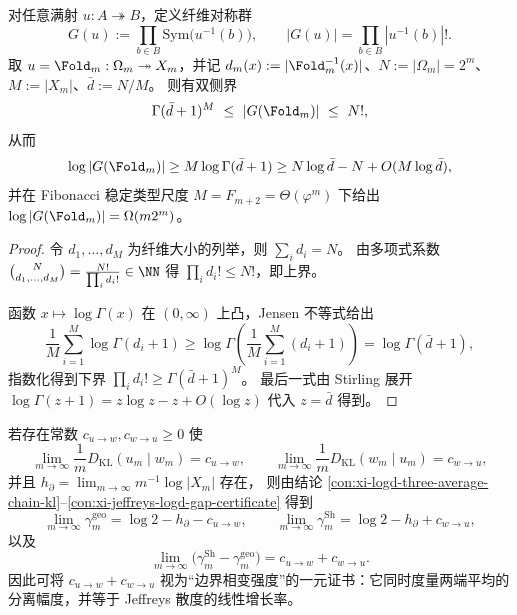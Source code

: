 \begin{proposition}\label{prop:xi-fold-fiber-symmetry-group-entropy-lower}
对任意满射 \(u:A\twoheadrightarrow B\)，定义纤维对称群
\[
G(u):=\prod_{b\in B}\mathrm{Sym}\bigl(u^{-1}(b)\bigr),
\qquad
|G(u)|=\prod_{b\in B}|u^{-1}(b)|!.
\]
取 \(u=\Fold_m:\Omega_m\twoheadrightarrow X_m\)，并记 \(d_m(x):=|\Fold_m^{-1}(x)|\)、\(N:=|\Omega_m|=2^m\)、\(M:=|X_m|\)、\(\bar d:=N/M\)。
则有双侧界
\[
\Gamma(\bar d+1)^{M}\ \le\ |G(\Fold_m)|\ \le\ N!,
\]
从而
\[
\log|G(\Fold_m)|
\ge
M\log\Gamma(\bar d+1)
\ge
N\log\bar d-N+O(M\log\bar d),
\]
并在 Fibonacci 稳定类型尺度 \(M=F_{m+2}=\Theta(\varphi^m)\) 下给出
\(
\log|G(\Fold_m)|=\Omega(m2^m)
\)。
\end{proposition}
\begin{proof}
令 \(d_1,\dots,d_M\) 为纤维大小的列举，则 \(\sum_i d_i=N\)。
由多项式系数
\(
\binom{N}{d_1,\dots,d_M}=\frac{N!}{\prod_i d_i!}\in\NN
\)
得 \(\prod_i d_i!\le N!\)，即上界。
\par
函数 \(x\mapsto \log\Gamma(x)\) 在 \((0,\infty)\) 上凸，Jensen 不等式给出
\[
\frac1M\sum_{i=1}^M\log\Gamma(d_i+1)\ge \log\Gamma\!\left(\frac1M\sum_{i=1}^M(d_i+1)\right)=\log\Gamma(\bar d+1),
\]
指数化得到下界 \(\prod_i d_i!\ge \Gamma(\bar d+1)^M\)。
最后一式由 Stirling 展开 \(\log\Gamma(z+1)=z\log z-z+O(\log z)\) 代入 \(z=\bar d\) 得到。
\end{proof}


\begin{conclusion}\label{con:xi-boundary-phase-transition-kl-rates}
若存在常数 \(c_{u\to w},c_{w\to u}\ge 0\) 使
\[
\lim_{m\to\infty}\frac{1}{m}D_{\mathrm{KL}}(u_m\mid w_m)=c_{u\to w},
\qquad
\lim_{m\to\infty}\frac{1}{m}D_{\mathrm{KL}}(w_m\mid u_m)=c_{w\to u},
\]
并且 \(h_\partial=\lim_{m\to\infty}m^{-1}\log|X_m|\) 存在，
则由结论 \ref{con:xi-logd-three-average-chain-kl}--\ref{con:xi-jeffreys-logd-gap-certificate} 得到
\[
\lim_{m\to\infty}\gamma_m^{\mathrm{geo}}=\log 2-h_\partial-c_{u\to w},
\qquad
\lim_{m\to\infty}\gamma_m^{\mathrm{Sh}}=\log 2-h_\partial+c_{w\to u},
\]
以及
\[
\lim_{m\to\infty}\bigl(\gamma_m^{\mathrm{Sh}}-\gamma_m^{\mathrm{geo}}\bigr)=c_{u\to w}+c_{w\to u}.
\]
因此可将 \(c_{u\to w}+c_{w\to u}\) 视为“边界相变强度”的一元证书：它同时度量两端平均的分离幅度，并等于 Jeffreys 散度的线性增长率。
\end{conclusion}

